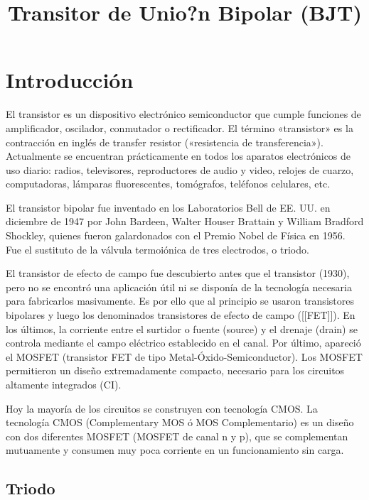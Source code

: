 \documentclass{article}
\title{Transitor de Unio?n Bipolar (BJT)}
\begin{document}
    
    
    \maketitle
    
    

    
    \section{Introducción}\label{introducciuxf3n}

El transistor es un dispositivo electrónico semiconductor que cumple
funciones de amplificador, oscilador, conmutador o rectificador. El
término «transistor» es la contracción en inglés de transfer resistor
(«resistencia de transferencia»). Actualmente se encuentran
prácticamente en todos los aparatos electrónicos de uso diario: radios,
televisores, reproductores de audio y video, relojes de cuarzo,
computadoras, lámparas fluorescentes, tomógrafos, teléfonos celulares,
etc.

El transistor bipolar fue inventado en los Laboratorios Bell de EE. UU.
en diciembre de 1947 por John Bardeen, Walter Houser Brattain y William
Bradford Shockley, quienes fueron galardonados con el Premio Nobel de
Física en 1956. Fue el sustituto de la válvula termoiónica de tres
electrodos, o triodo.

El transistor de efecto de campo fue descubierto antes que el transistor
(1930), pero no se encontró una aplicación útil ni se disponía de la
tecnología necesaria para fabricarlos masivamente. Es por ello que al
principio se usaron transistores bipolares y luego los denominados
transistores de efecto de campo ({[}{[}FET{]}{]}). En los últimos, la
corriente entre el surtidor o fuente (source) y el drenaje (drain) se
controla mediante el campo eléctrico establecido en el canal. Por
último, apareció el MOSFET (transistor FET de tipo
Metal-Óxido-Semiconductor). Los MOSFET permitieron un diseño
extremadamente compacto, necesario para los circuitos altamente
integrados (CI).

Hoy la mayoría de los circuitos se construyen con tecnología CMOS. La
tecnología CMOS (Complementary MOS ó MOS Complementario) es un diseño
con dos diferentes MOSFET (MOSFET de canal n y p), que se complementan
mutuamente y consumen muy poca corriente en un funcionamiento sin carga.

\subsection{Triodo}\label{triodo}
\end{document}
